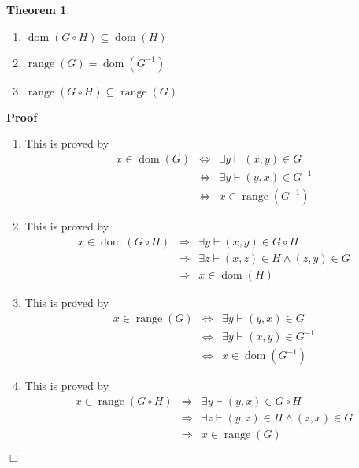 \documentclass{book}
\newcommand{\tmop}[1]{\ensuremath{\operatorname{#1}}}
\newenvironment{proof}{\noindent\textbf{Proof\ }}{\hspace*{\fill}$\Box$\medskip}
\newtheorem{theorem}{Theorem}
\begin{document}
{{\begin{theorem}
\begin{enumerate}
    \item $\tmop{dom} (G \circ H) \subseteq \tmop{dom} (H)$
    
    \item $\tmop{range} (G) = \tmop{dom} (G^{- 1})$
    
    \item $\tmop{range} (G \circ H) \subseteq \tmop{range} (G)$
  \end{enumerate}
\end{theorem}

\begin{proof}
  
  \begin{enumerate}
    \item This is proved by
    \begin{eqnarray*}
      x \in \tmop{dom} (G) & \Leftrightarrow & \exists y \vdash (x, y) \in G\\
      & \Leftrightarrow & \exists y \vdash (y, x) \in G^{- 1}\\
      & \Leftrightarrow & x \in \tmop{range} (G^{- 1})
    \end{eqnarray*}
    \item This is proved by
    \begin{eqnarray*}
      x \in \tmop{dom} (G \circ H) & \Rightarrow & \exists y \vdash (x, y) \in
      G \circ H\\
      & \Rightarrow & \exists z \vdash (x, z) \in H \wedge (z, y) \in G\\
      & \Rightarrow & x \in \tmop{dom} (H)
    \end{eqnarray*}
    \item This is proved by
    \begin{eqnarray*}
      x \in \tmop{range} (G) & \Leftrightarrow & \exists y \vdash (y, x) \in
      G\\
      & \Leftrightarrow & \exists y \vdash (x, y) \in G^{- 1}\\
      & \Leftrightarrow & x \in \tmop{dom} (G^{- 1})
    \end{eqnarray*}
    \item This is proved by
    \begin{eqnarray*}
      x \in \tmop{range} (G \circ H) & \Rightarrow & \exists y \vdash (y, x)
      \in G \circ H\\
      & \Rightarrow & \exists z \vdash (y, z) \in H \wedge (z, x) \in G\\
      & \Rightarrow & x \in \tmop{range} (G)
    \end{eqnarray*}
  \end{enumerate}
\end{proof}

}}
\end{document}
